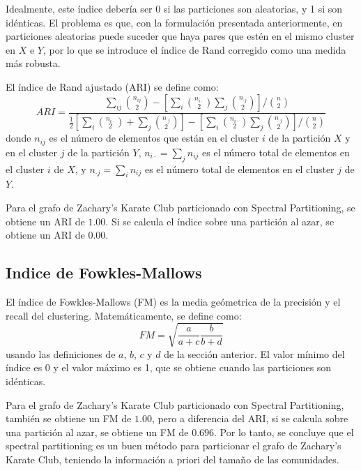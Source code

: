\documentclass{article}
\begin{document}
Idealmente, este índice debería ser 0 si las particiones son aleatorias, y 1 si son idénticas. El problema es que, con la formulación presentada anteriormente, en particiones aleatorias puede suceder que haya pares que estén en el mismo cluster en $X$ e $Y$, por lo que se introduce el índice de Rand corregido como una medida más robusta.

El índice de Rand ajustado (ARI) se define como:
\begin{equation}
    ARI = \frac{\sum_{ij} \binom{n_{ij}}{2} - \left[\sum_i \binom{n_{i\cdot}}{2} \sum_j \binom{n_{\cdot j}}{2}\right] / \binom{n}{2}}{\frac{1}{2}\left[\sum_i \binom{n_{i\cdot}}{2} + \sum_j \binom{n_{\cdot j}}{2}\right] - \left[\sum_i \binom{n_{i\cdot}}{2} \sum_j \binom{n_{\cdot j}}{2}\right] / \binom{n}{2}}
\end{equation}
donde $n_{ij}$ es el número de elementos que están en el cluster $i$ de la partición $X$ y en el cluster $j$ de la partición $Y$, $n_{i\cdot} = \sum_j n_{ij}$ es el número total de elementos en el cluster $i$ de $X$, y $n_{\cdot j} = \sum_i n_{ij}$ es el número total de elementos en el cluster $j$ de $Y$.


Para el grafo de Zachary's Karate Club particionado con Spectral Partitioning, se obtiene un ARI de $1.00$. Si se calcula el índice sobre una partición al azar, se obtiene un ARI de $0.00$.

\subsection{Indice de Fowkles-Mallows}

El índice de Fowkles-Mallows (FM) es la media geómetrica de la precisión y el recall del clustering. Matemáticamente, se define como:
\begin{equation}
    FM = \sqrt{\frac{a}{a+c}\frac{b}{b+d}}
\end{equation}
usando las definiciones de $a$, $b$, $c$ y $d$ de la sección anterior. El valor mínimo del índice es 0 y el valor máximo es 1, que se obtiene cuando las particiones son idénticas.


Para el grafo de Zachary's Karate Club particionado con Spectral Partitioning, también se obtiene un FM de $1.00$, pero a diferencia del ARI, si se calcula sobre una partición al azar, se obtiene un FM de $0.696$. Por lo tanto, se concluye que el spectral partitioning es un buen método para particionar el grafo de Zachary's Karate Club, teniendo la información a priori del tamaño de las comunidades.
\end{document}
